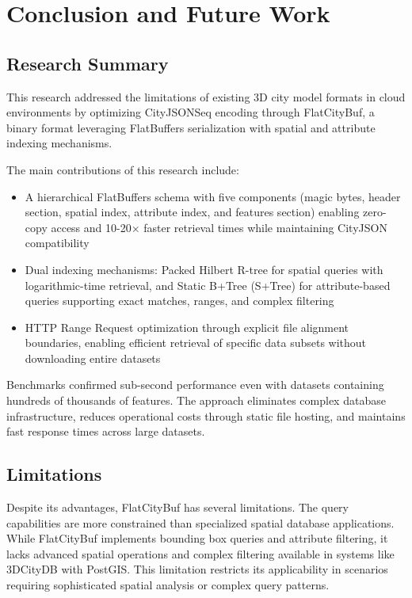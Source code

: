 \chapter{Conclusion and Future Work}
\label{chp:conclusion}

\section{Research Summary}
\label{conclusion:research_summary}

This research addressed the limitations of existing 3D city model formats in cloud environments by optimizing CityJSONSeq encoding through FlatCityBuf, a binary format leveraging FlatBuffers serialization with spatial and attribute indexing mechanisms.

The main contributions of this research include:

\begin{itemize}
  \item A hierarchical FlatBuffers schema with five components (magic bytes, header section, spatial index, attribute index, and features section) enabling zero-copy access and 10-20× faster retrieval times while maintaining CityJSON compatibility

  \item Dual indexing mechanisms: Packed Hilbert R-tree for spatial queries with logarithmic-time retrieval, and Static B+Tree (S+Tree) for attribute-based queries supporting exact matches, ranges, and complex filtering

  \item HTTP Range Request optimization through explicit file alignment boundaries, enabling efficient retrieval of specific data subsets without downloading entire datasets
\end{itemize}

Benchmarks confirmed sub-second performance even with datasets containing hundreds of thousands of features. The approach eliminates complex database infrastructure, reduces operational costs through static file hosting, and maintains fast response times across large datasets.

\section{Limitations}
\label{conclusion:limitations}

Despite its advantages, FlatCityBuf has several limitations. The query capabilities are more constrained than specialized spatial database applications. While FlatCityBuf implements bounding box queries and attribute filtering, it lacks advanced spatial operations and complex filtering available in systems like 3DCityDB with PostGIS. This limitation restricts its applicability in scenarios requiring sophisticated spatial analysis or complex query patterns.

